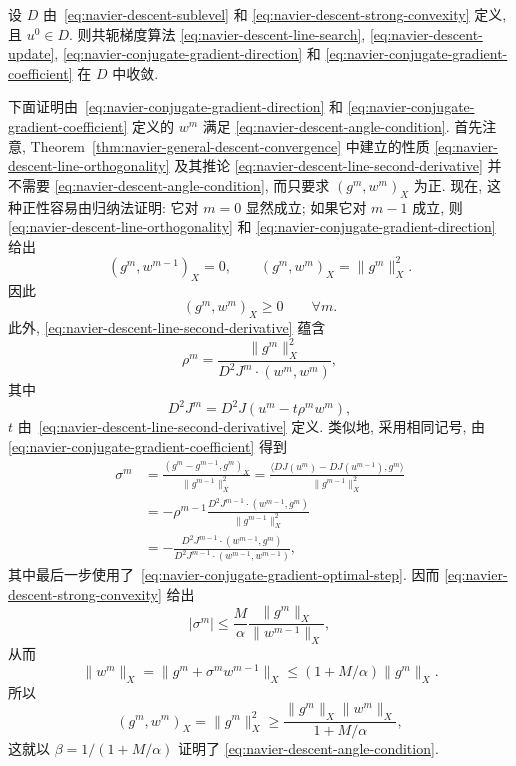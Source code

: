 \setcounter{statement}{1}
\begin{Theorem}
\label{thm:navier-conjugate-gradient-convergence}
设 $D$ 由 \,\eqref{eq:navier-descent-sublevel} 和
\eqref{eq:navier-descent-strong-convexity} 定义, 且 $u^0\in D$. 则共轭梯度算法
\eqref{eq:navier-descent-line-search}, \eqref{eq:navier-descent-update},
\eqref{eq:navier-conjugate-gradient-direction} 和
\eqref{eq:navier-conjugate-gradient-coefficient} 在 $D$ 中收敛.
\end{Theorem}

\begin{Proof}
下面证明由 \,\eqref{eq:navier-conjugate-gradient-direction} 和
\eqref{eq:navier-conjugate-gradient-coefficient} 定义的 $w^m$ 满足
\eqref{eq:navier-descent-angle-condition}. 首先注意,
Theorem~\ref{thm:navier-general-descent-convergence} 中建立的性质
\eqref{eq:navier-descent-line-orthogonality} 及其推论
\eqref{eq:navier-descent-line-second-derivative} 并不需要
\eqref{eq:navier-descent-angle-condition}, 而只要求 $(g^m,w^m)_X$ 为正.
现在, 这种正性容易由归纳法证明: 它对 $m=0$ 显然成立; 如果它对 $m-1$ 成立,
则 \,\eqref{eq:navier-descent-line-orthogonality} 和
\eqref{eq:navier-conjugate-gradient-direction} 给出
\[
(g^m,w^{m-1})_X=0,
\qquad
(g^m,w^m)_X=\|g^m\|_X^2.
\]
因此
\[
(g^m,w^m)_X\geq0\qquad\forall m.
\]
此外, \eqref{eq:navier-descent-line-second-derivative} 蕴含
\begin{equation}
\label{eq:navier-conjugate-gradient-optimal-step}
\rho^m=\frac{\|g^m\|_X^2}{D^2J^m\mathbin{\cdot}(w^m,w^m)},
\end{equation}
其中
\[
D^2J^m=D^2J(u^m-t\rho^mw^m),
\]
$t$ 由 \,\eqref{eq:navier-descent-line-second-derivative} 定义. 类似地, 采用相同记号,
由 \,\eqref{eq:navier-conjugate-gradient-coefficient} 得到
\[
\begin{aligned}
\sigma^m
&=\frac{(g^m-g^{m-1},g^m)_X}{\|g^{m-1}\|_X^2}
=\frac{\langle DJ(u^m)-DJ(u^{m-1}),g^m\rangle}{\|g^{m-1}\|_X^2}\\
&=-\rho^{m-1}\frac{D^2J^{m-1}\mathbin{\cdot}(w^{m-1},g^m)}{\|g^{m-1}\|_X^2}\\
&=-\frac{D^2J^{m-1}\mathbin{\cdot}(w^{m-1},g^m)}
{D^2J^{m-1}\mathbin{\cdot}(w^{m-1},w^{m-1})},
\end{aligned}
\]
其中最后一步使用了 \,\eqref{eq:navier-conjugate-gradient-optimal-step}. 因而
\eqref{eq:navier-descent-strong-convexity} 给出
\[
|\sigma^m|\leq\frac M\alpha\frac{\|g^m\|_X}{\|w^{m-1}\|_X},
\]
从而
\[
\|w^m\|_X=\|g^m+\sigma^mw^{m-1}\|_X
\leq(1+M/\alpha)\|g^m\|_X.
\]
所以
\[
(g^m,w^m)_X=\|g^m\|_X^2
\geq\frac{\|g^m\|_X\|w^m\|_X}{1+M/\alpha},
\]
这就以 $\beta=1/(1+M/\alpha)$ 证明了
\eqref{eq:navier-descent-angle-condition}.
\end{Proof}

